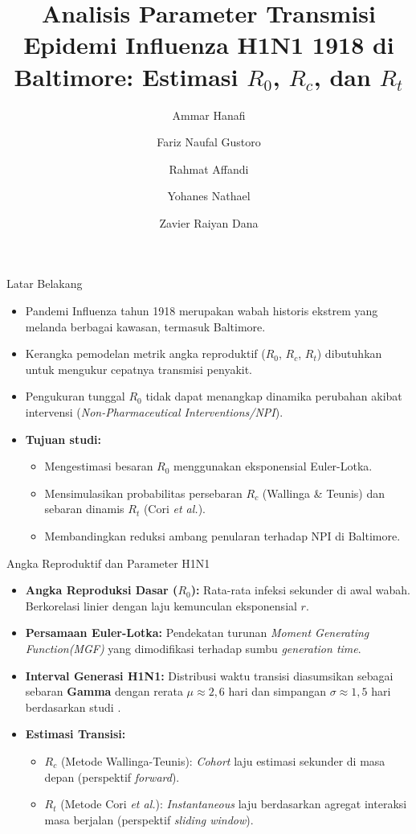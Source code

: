 \documentclass[aspectratio=169]{beamer}
\title[Analisis H1N1 1918]{Analisis Parameter Transmisi Epidemi Influenza H1N1 1918 di Baltimore: Estimasi \texorpdfstring{$R_0$}{R0}, \texorpdfstring{$R_c$}{Rc}, dan \texorpdfstring{$R_t$}{Rt}}
\author[Hanafi dkk.]{Ammar Hanafi \and Fariz Naufal Gustoro \and Rahmat Affandi \and Yohanes Nathael \and Zavier Raiyan Dana}
\institute[UI]{Departemen Matematika, Universitas Indonesia, Depok, Indonesia.}
\date{}
\begin{document}
\begin{frame}
    \titlepage
\end{frame}

\begin{frame}{Latar Belakang}
    \begin{itemize}
        \item Pandemi Influenza tahun 1918 merupakan wabah historis ekstrem yang melanda berbagai kawasan, termasuk Baltimore.
        \item Kerangka pemodelan metrik angka reproduktif ($R_0$, $R_c$, $R_t$) dibutuhkan untuk mengukur cepatnya transmisi penyakit.
        \item Pengukuran tunggal $R_0$ tidak dapat menangkap dinamika perubahan akibat intervensi (\textit{Non-Pharmaceutical Interventions/NPI}).
        \item \textbf{Tujuan studi:} 
        \begin{itemize}
            \item Mengestimasi besaran $R_0$ menggunakan eksponensial Euler-Lotka.
            \item Mensimulasikan probabilitas persebaran $R_c$ (Wallinga \& Teunis) dan sebaran dinamis $R_t$ (Cori \textit{et al.}).
            \item Membandingkan reduksi ambang penularan terhadap NPI di Baltimore.
        \end{itemize}
    \end{itemize}
\end{frame}

\begin{frame}{Angka Reproduktif dan Parameter H1N1}
    \begin{itemize}
        \item \textbf{Angka Reproduksi Dasar ($R_0$):} Rata-rata infeksi sekunder di awal wabah. Berkorelasi linier dengan laju kemunculan eksponensial $r$.
        \item \textbf{Persamaan Euler-Lotka:} Pendekatan turunan \textit{Moment Generating Function(MGF)} yang dimodifikasi terhadap sumbu \textit{generation time}.
        \item \textbf{Interval Generasi H1N1:} Distribusi waktu transisi diasumsikan sebagai sebaran \textbf{Gamma} dengan rerata $\mu \approx 2,6$ hari dan simpangan $\sigma \approx 1,5$ hari berdasarkan studi \cite{White2009}.
        \item \textbf{Estimasi Transisi:}
        \begin{itemize}
            \item \textbf{$R_c$} (Metode Wallinga-Teunis): \textit{Cohort} laju estimasi sekunder di masa depan (perspektif \textit{forward}).
            \item \textbf{$R_t$} (Metode Cori \textit{et al.}): \textit{Instantaneous} laju berdasarkan agregat interaksi masa berjalan (perspektif \textit{sliding window}).
        \end{itemize}
    \end{itemize}
\end{frame}
\end{document}
